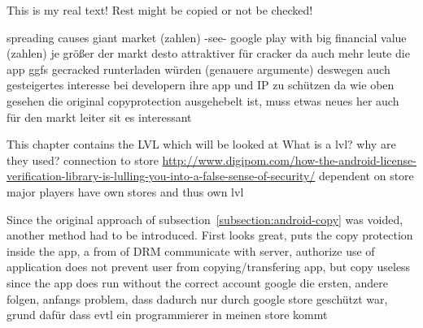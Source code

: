 This is my real text! Rest might be copied or not be checked!


spreading causes giant market (zahlen) -see- google play with big financial value (zahlen)\newline
je größer der markt desto attraktiver für cracker da auch mehr leute die app ggfs gecracked runterladen würden (genauere argumente)\newline
deswegen auch gesteigertes interesse bei developern ihre app und IP zu schützen\newline
da wie oben gesehen die original copyprotection ausgehebelt ist, muss etwas neues her\newline
auch für den markt leiter sit es interessant


This chapter contains the LVL which will be looked at\newline
What is a lvl? why are they used? connection to store\newline
\url{http://www.digipom.com/how-the-android-license-verification-library-is-lulling-you-into-a-false-sense-of-security/}\newline
dependent on store\newline
major players have own stores and thus own lvl\newline


Since the original approach of subsection~\ref{subsection:android-copy} was voided, another method had to be introduced.
First looks great, puts the copy protection inside the app, a from of DRM\newline
communicate with server, authorize use of application\newline
does not prevent user from copying/transfering app, but copy useless since the app does run without the correct account\newline
google die ersten, andere folgen, anfangs problem, dass dadurch nur durch google store geschützt war, grund dafür dass evtl ein programmierer in meinen store kommt\newline
